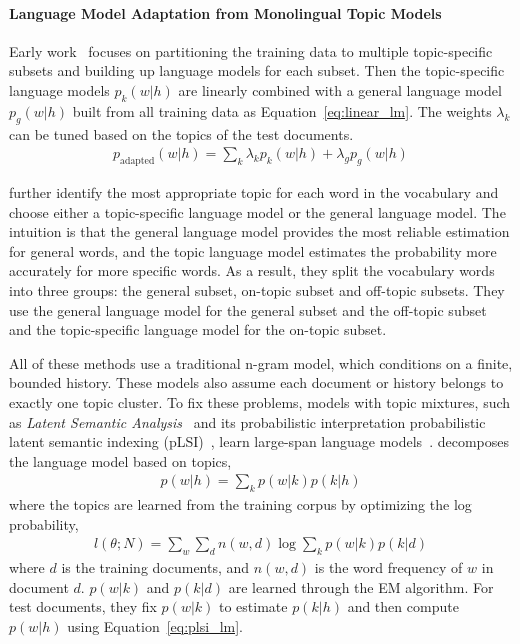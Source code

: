 \paragraph{Language Model Adaptation from Monolingual Topic Models}

Early work~\citep{Clarkson-1997,Seymore-1997,Kneser-1997,Iyer-1999} focuses on
partitioning the training data to multiple topic-specific subsets and
building up language models for each subset. Then the topic-specific
language models $p_k(w|h)$ are linearly combined with a general
language model $p_g(w|h)$ built from all training data as
Equation~\ref{eq:linear_lm}. The weights $\lambda_k$ can be tuned
based on the topics of the test documents.
\begin{align}
\label{eq:linear_lm}
p_\textrm{adapted}(w|h) = \sum_k \lambda_k p_k(w|h) + \lambda_g p_g(w|h)
\end{align}

\citet{Seymore-1998} further identify the most appropriate topic for
each word in the vocabulary and choose either a topic-specific language model
or the general language model. The intuition is that the general
language model provides the most reliable estimation for general
words, and the topic language model estimates the probability more
accurately for more specific words. As a result, they split the vocabulary
words into three groups: the general subset, on-topic subset and
off-topic subsets. They use the general language model for the general subset and the off-topic subset and the topic-specific language model for  the
on-topic subset.

All of these methods use a traditional n-gram model, which conditions on a finite, bounded history.
These models also assume each document or history belongs
to exactly one topic cluster.
To fix these problems, models with topic mixtures, such as
\emph{Latent Semantic Analysis}~\citep[\textsc{lsa}]{deerwester-90}
and its probabilistic interpretation probabilistic latent semantic
indexing (pLSI)~\citep[\textsc{plsi}]{hofmann-99},
learn large-span language
models~\citep{Bellegarda-1997,Coccaro-1998,Gildea-1999}. \citet{Gildea-1999}
decomposes the language model based on topics,
\begin{align}
\label{eq:plsi_lm}
p(w|h) = \sum_k p(w|k) p(k|h)
\end{align}
where the topics are learned from the training corpus by optimizing the log probability,
\begin{align}
l(\theta; N) = \sum_w \sum_d n(w,d) \log \sum_k p(w|k) p(k|d)
\end{align}
where $d$ is the training documents, and $n(w,d)$ is the word frequency of $w$ in document $d$. $p(w|k)$ and $p(k|d)$ are learned through the EM algorithm. For test documents, they fix $p(w|k)$ to estimate $p(k|h)$ and then compute $p(w|h)$ using Equation~\ref{eq:plsi_lm}. 

